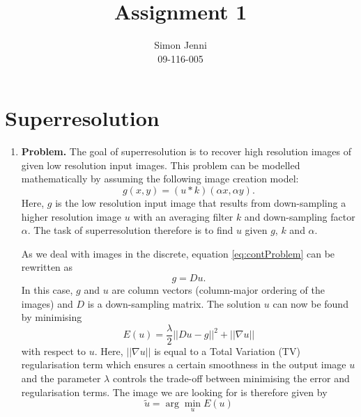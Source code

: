 \documentclass{paper}
\title{Assignment 1}
\author{Simon Jenni\\09-116-005}
\begin{document}
\maketitle


%

\section*{Superresolution}

\begin{enumerate}
\item \textbf{Problem.} The goal of superresolution is to recover high resolution images of given low resolution input images. This problem can be modelled mathematically by assuming the following image creation model: 
\begin{equation}\label{eq:contProblem}
g(x,y)=(u*k)(\alpha x, \alpha y).
\end{equation}
Here, $g$ is the low resolution input image that results from down-sampling a higher resolution image $u$ with an averaging filter $k$ and down-sampling factor $\alpha$. The task of superresolution therefore is to find $u$ given $g$, $k$ and $\alpha$.

As we deal with images in the discrete, equation \ref{eq:contProblem} can be rewritten as
\begin{equation}
g=Du.
\end{equation}
In this case, $g$ and $u$ are column vectors (column-major ordering of the images) and $D$ is a down-sampling matrix. The solution $u$ can now be found by minimising 
\begin{equation}\label{eq:energy}
E(u)=\frac{\lambda}{2}||Du-g||^2+||\nabla u||
\end{equation}
with respect to $u$.  Here, $||\nabla u||$ is equal to a Total Variation (TV) regularisation term which ensures a certain smoothness in the output image $u$ and the parameter $\lambda$ controls the trade-off between minimising the error and regularisation terms. The image we are looking for is therefore given by
\begin{equation}\label{eq:solution}
\tilde{u}=\arg\min_{u} E(u)
\end{equation}


\end{enumerate}
\end{document}

